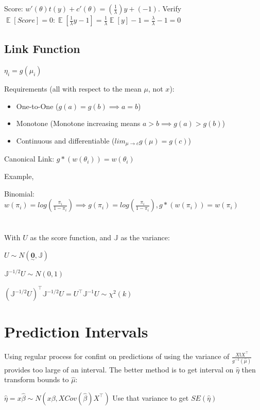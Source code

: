 \documentclass{article}
\newcommand{\svec}[1]{\underset{\sim}{\bm{#1}}} %
\DeclareMathOperator{\EX}{\mathbb{E}} %
\begin{document}
Score: $w'(\theta)t(y) + c'(\theta) = (\frac{1}{\lambda})y + (-1)$. Verify $\EX[Score] = 0: \EX[\frac{1}{\lambda}y-1] = \frac{1}{\lambda}\EX[y] - 1 = \frac{\lambda}{\lambda} - 1 = 0$

\subsection{Link Function}

$\eta_i = g(\mu_i)$

Requirements (all with respect to the mean $\mu$, not $x$):
\begin{itemize}
    \item One-to-One ($g(a) = g(b) \implies a=b$)
    \item Monotone (Monotone increasing means $a >b \implies g(a) > g(b)$)
    \item Continuous and differentiable ($lim_{\mu \to c}g(\mu) = g(c)$)
\end{itemize}

Canonical Link: $g*(w(\theta_i)) = w(\theta_i)$

Example, 

Binomial: $w(\pi_i) = log(\frac{\pi_i}{1-\pi_i}) \implies g(\pi_i) = log(\frac{\pi_i}{1-\pi_i}), g*(w(\pi_i)) = w(\pi_i)$


\section{}

With $U$ as the score function, and $\mathbb{J}$ as the variance:

$U \sim N(\svec{0}, \mathbb{J})$

$\mathbb{J}^{-1/2} U \sim N(0,1)$

$(\mathbb{J}^{-1/2} U)^{\top}\mathbb{J}^{-1/2} U = U^{\top}\mathbb{J}^{-1}U \sim \chi^2(k)$


\section{Prediction Intervals}

Using regular process for confint on predictions of using the variance of $\frac{X \mathbb{I}X^{\top}}{g^{-1}(\hat{\mu})}$ provides too large of an interval. The better method is to get interval on $\hat{\eta}$ then transform bounds to $\hat{\mu}$:

$\hat{\eta} = x\hat{\beta} \sim N(x\beta, X Cov(\hat{\beta})X^{\top})$ Use that variance to get $SE(\hat{\eta})$
\end{document}
